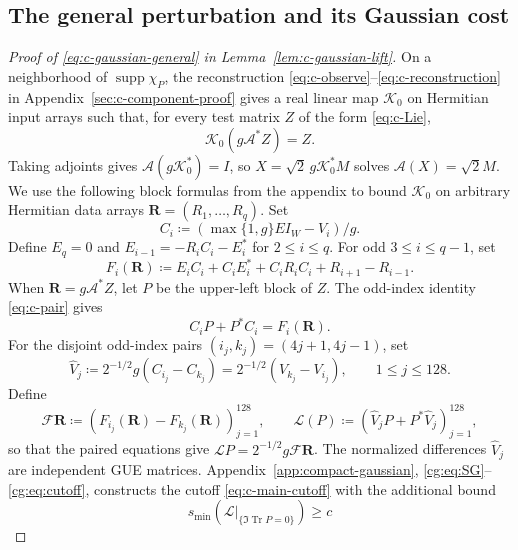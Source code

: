 \documentclass[11pt]{article}
\numberwithin{equation}{section}
\theoremstyle{remark}
\newcommand{\Tr}{\operatorname{Tr}}
\newcommand{\supp}{\operatorname{supp}}
\begin{document}
\subsection{The general perturbation and its Gaussian cost}

\begin{proof}[Proof of \eqref{eq:c-gaussian-general} in Lemma~\ref{lem:c-gaussian-lift}]
On a neighborhood of $\supp\chi_P$, the reconstruction
\eqref{eq:c-observe}--\eqref{eq:c-reconstruction} in
Appendix~\ref{sec:c-component-proof} gives a real linear map $\mathcal K_0$
on Hermitian input arrays such that, for every test matrix $Z$ of
the form \eqref{eq:c-Lie},
\begin{equation}\label{eq:c-main-left-inverse}
 \mathcal K_0(g\mathcal A^*Z)=Z.
\end{equation}
Taking adjoints gives $\mathcal A(g\mathcal K_0^*)=I$, so
$X=\sqrt2\,g\mathcal K_0^*M$ solves $\mathcal A(X)=\sqrt2 M$.
We use the following block formulas from the appendix to bound
$\mathcal K_0$ on arbitrary Hermitian data arrays $\mathbf R=(R_1,\ldots,R_q)$.
Set
\begin{equation}\label{eq:c-transfer-block}
 C_i\coloneqq (\max\{1,g\}E I_W-V_i)/g.
\end{equation}
Define $E_q=0$ and
$E_{i-1}=-R_iC_i-E_i^*$ for $2\le i\le q$. For odd
$3\le i\le q-1$, set
\begin{equation}\label{eq:c-data-map}
 F_i(\mathbf R)\coloneqq
 E_iC_i+C_iE_i^*+C_iR_iC_i+R_{i+1}-R_{i-1}.
\end{equation}
When $\mathbf R=g\mathcal A^*Z$, let $P$ be the upper-left block of $Z$.
The odd-index identity \eqref{eq:c-pair} gives
\begin{equation}\label{eq:c-block-equations}
 C_iP+P^*C_i=F_i(\mathbf R).
\end{equation}
For the disjoint odd-index pairs $(i_j,k_j)=(4j+1,4j-1)$, set
\[
 \widehat V_j\coloneqq2^{-1/2}g(C_{i_j}-C_{k_j})
 =2^{-1/2}(V_{k_j}-V_{i_j}),\qquad 1\le j\le128.
\]
Define
\[
 \mathcal F\mathbf R\coloneqq
 (F_{i_j}(\mathbf R)-F_{k_j}(\mathbf R))_{j=1}^{128},\qquad
 \mathcal L(P)\coloneqq(\widehat V_jP+P^*\widehat V_j)_{j=1}^{128},
\]
so that the paired equations give $\mathcal LP=2^{-1/2}g\mathcal F\mathbf R$.
The normalized differences $\widehat V_j$ are independent GUE matrices.
Appendix~\ref{app:compact-gaussian}, \eqref{cg:eq:SG}--\eqref{cg:eq:cutoff},
constructs the cutoff \eqref{eq:c-main-cutoff} with the additional bound
\begin{equation}\label{eq:c-main-coercivity}
 s_{\min}(\mathcal L|_{\{\Im\Tr P=0\}})\ge c

\end{equation}
\end{proof}
\end{document}
